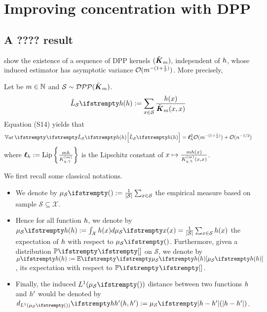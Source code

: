 

\chapter{Improving concentration with DPP}
\section{A ???? result}


\cite{bardenet2021sgddpp} show the existence of a sequence of DPP kernels $(\tilde{\boldsymbol K}_{m})$, independent of $h$, whose induced estimator has asymptotic variance $\mathcal{O}( m ^{-(1+\frac 1 d)})$. More precisely, 

\begin{tcolorbox}
	\begin{theorem}
		\label{thm_sgdpaper}
		Let be $m\in \mathbb{N}$ and $\mathcal{S} \sim  \mathcal{DPP}(\tilde{\boldsymbol K}_{m})$.
		\begin{equation}
			\estloss{\mathcal{S}}{\threequery} := \sum_{x \in \mathcal{S}} \frac{\threequery(x)}{\opekernel{m}(x,x)}
		\end{equation}
		Equation (S14) yields that 
		\begin{equation}
			\Var{}{\estloss{\mathcal{S}}{\threequery}} = \lipschitz^2_\threequery \OO( m ^{-(1+\frac 1 d)}) +\OO( n^{-1/2})
		\end{equation}
		where $\boldsymbol\ell_h := \operatorname{Lip}\left\{\frac{mh}{K^{(m)}_{q, \tilde \gamma}} \right\}$ is the Lipschitz constant of $x \mapsto \frac{mh(x)}{K^{(m)}_{q, \tilde \gamma}(x,x)}$.
	\end{theorem}
\end{tcolorbox}



We first recall some classical notations.
\begin{itemize}
	\item We denote by $\empdistr{\mathcal{S}}{}:=\frac{1}{|\mathcal{S}|} \sum_{x \in \mathcal{S}}$ the empirical measure based on sample $\mathcal{S}  \subseteq \mathcal{X}$. 
	\item Hence for all function $h$, we denote by $\empdistr{\mathcal{S}}{\threequery}:=\int_{\mathcal{X}} \threequery(x) d\empdistr{\mathcal{S}}{x} = \frac{1}{|\mathcal{S}|} \sum_{x \in \mathcal{S}} \threequery(x)$ the expectation of $h$ with respect to $\empdistr{\mathcal{S}}{}$. Furthermore, given a distribution $\PP{}{}$ on $\mathcal{S}$, we denote by $\meanempdistr{\threequery}:=\EE{}{\empdistr{\mathcal{S}}{\threequery}}$, its expectation with respect to $\PP{}{}$. 
	\item Finally, the induced $L^1(\empdistr{\mathcal{S}}{})$ distance between two functions $h$ and $h'$ would be denoted by $\dlone{\empdistr{\mathcal{S}}{}}{\threequery}{\threequery'}:=\empdistr{\mathcal{S}}{|\threequery - \threequery'|}$.
\end{itemize}  


